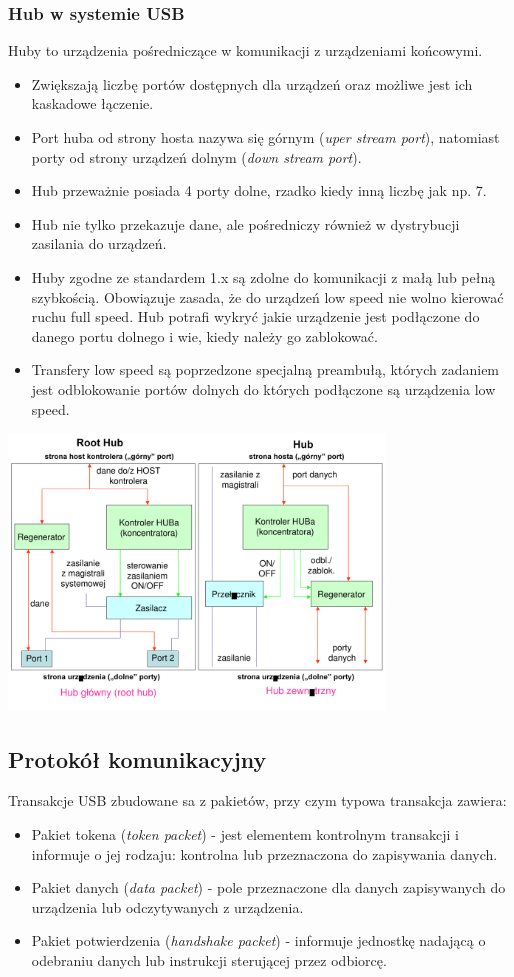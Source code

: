 		\subsubsection{Hub w systemie USB}
		Huby to urządzenia pośredniczące w komunikacji z urządzeniami końcowymi.
		\begin{itemize}
			\item Zwiększają liczbę portów dostępnych dla urządzeń oraz możliwe jest ich kaskadowe łączenie.
			\item Port huba od strony hosta nazywa się górnym (\emph{uper stream port}), natomiast porty od strony urządzeń dolnym (\emph{down stream port}).
			\item Hub przeważnie posiada 4 porty dolne, rzadko kiedy inną liczbę jak np. 7.
			\item Hub nie tylko przekazuje dane, ale pośredniczy również w dystrybucji zasilania do urządzeń.
			\item Huby zgodne ze standardem 1.x są zdolne do komunikacji z małą lub pełną szybkością. Obowiązuje zasada, że do urządzeń low speed nie wolno kierować ruchu full speed. Hub potrafi wykryć jakie urządzenie jest podłączone do danego portu dolnego i wie, kiedy należy go zablokować.
			\item Transfery low speed są poprzedzone specjalną preambułą, których zadaniem jest odblokowanie portów dolnych do których podłączone są urządzenia low speed.
		\end{itemize}
		\includegraphics[width=10cm]{./wyklady/USB_17_1.pdf}
	
\subsection{Protokół komunikacyjny}
	Transakcje USB zbudowane sa z pakietów, przy czym typowa transakcja zawiera:
	\begin{itemize}
		\item Pakiet tokena (\emph{token packet}) - jest elementem kontrolnym transakcji i informuje o jej rodzaju: kontrolna lub przeznaczona do zapisywania danych.
		\item Pakiet danych (\emph{data packet}) - pole przeznaczone dla danych zapisywanych do urządzenia lub odczytywanych z urządzenia.
		\item Pakiet potwierdzenia (\emph{handshake packet}) - informuje jednostkę nadającą o odebraniu danych lub instrukcji sterującej przez odbiorcę.
	\end{itemize}
